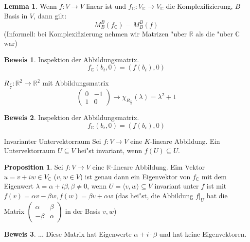 \documentclass[oneside,fontsize=11pt,paper=a4,BCOR=0mm,DIV=12,automark,headsepline]{scrbook}
\theoremstyle{remark}
\theoremstyle{definition}
\newtheorem*{proposition}{Proposition}
\newtheorem{lemma}{Lemma}[section]
\theoremstyle{definition}
\newtheorem*{prof}{Beweis}
\theoremstyle{remark}
\begin{document}
\begin{lemma}
  Wenn $f: V\to V$ linear ist und \(f_{\mathbb{C}}: V_{\mathbb{C}} \to V_{\mathbb{C}}\) die Komplexifizierung, $B$ Basis
  in $V$, dann gilt: \[M^B_B(f_{\mathbb{C}}) = M^B_B(f)\] (Informell: bei Komplexifizierung nehmen wir Matrizen "uber \(\mathbb{R}\) als die "uber \(\mathbb{C}\) war)
\end{lemma}

\begin{prof}
  Inspektion der Abbildungsmatrix. \[f_{\mathbb{C}}(b_i,0) = (f(b_i), 0)\]
\end{prof}
\begin{exa}
  \(R_{\frac{\pi}{2}}: \mathbb{R}^2\to\mathbb{R}^2\) mit Abbildungsmatrix
  \[
    \begin{pmatrix}
      0 & -1 \\
      1 & 0
    \end{pmatrix}
    \rightarrow \chi_{R_{\frac{\pi}{2}}}(\lambda) = \lambda^2 + 1
\]
\end{exa}

\begin{prof}
  Inspektion der Abbildungsmatrix. \[f_{\mathbb{C}}(b_i,0) = (f(b_i), 0)\]
\end{prof}

\begin{definition}{Invarianter Untervektorraum}{}
  Sei $f: V \mapsto V$ eine $K$-lineare Abbildung. Ein Untervektorraum
  $U\subseteq V$ hei"st invariant, wenn $f(U) \subseteq U$.
\end{definition}

\begin{proposition}
  Sei $f: V\to V$ eine \(\mathbb{R}\)-lineare Abbildung. Eim Vektor \(u = v + iw \in V_{\mathbb{C}}\) (\(v, w \in V\)) ist genau dann ein
  Eigenvektor von \(f_{\mathbb{C}}\) mit dem Eigenwert \(\lambda = \alpha + i\beta, \beta\neq 0\), wenn \(U = \langle v, w\rangle\subseteq V\) invariant unter $f$ ist
  mit \(f(v) = \alpha v - \beta w, f(w) = \beta v + \alpha w\) (das hei"st, die Abbildung \(f|_U\) hat die Matrix \(
  \begin{pmatrix}
    \alpha & \beta \\
    -\beta & \alpha
  \end{pmatrix}
\) in der Basis \(v, w\))
\end{proposition}
\begin{prof}
  ... Diese Matrix hat Eigenwerte $\alpha + i\cdot\beta$ und hat keine
  Eigenvektoren.
\end{prof}
\end{document}
